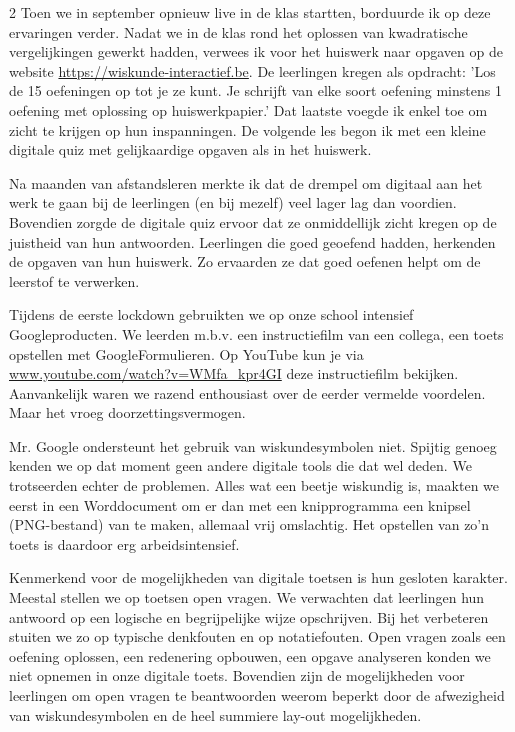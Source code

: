 \begin{multicols}{2}
Toen we in september opnieuw live in de klas startten, borduurde ik op deze ervaringen verder. Nadat we in de klas rond het oplossen van kwadratische vergelijkingen gewerkt hadden, verwees ik voor het huiswerk naar opgaven op de website \url{https://wiskunde-interactief.be}. De leerlingen kregen als opdracht: 'Los de 15 oefeningen op tot je ze kunt. Je schrijft van elke soort oefening minstens 1 oefening met oplossing op huiswerkpapier.' Dat laatste voegde ik enkel toe om zicht te krijgen op hun inspanningen.  De volgende les begon ik met een kleine digitale quiz met gelijkaardige opgaven als in het huiswerk. 

Na maanden van afstandsleren merkte ik dat de drempel om digitaal aan het werk te gaan bij de leerlingen (en bij mezelf) veel lager lag dan voordien. Bovendien zorgde de digitale quiz ervoor dat ze onmiddellijk zicht kregen op de juistheid van hun antwoorden. Leerlingen die goed geoefend hadden, herkenden de opgaven van hun huiswerk. Zo ervaarden ze dat goed oefenen helpt om de leerstof te verwerken.

\newpage
{}

Tijdens de eerste lockdown gebruikten we op onze school intensief Googleproducten. We leerden m.b.v. een instructiefilm van een collega, een toets opstellen met GoogleFormulieren. Op YouTube kun je via \url{www.youtube.com/watch?v=WMfa_kpr4GI} deze instructiefilm bekijken. Aanvankelijk waren we razend enthousiast over de eerder vermelde voordelen. Maar het vroeg doorzettingsvermogen. 

Mr. Google ondersteunt het gebruik van wiskundesymbolen niet. Spijtig genoeg kenden we op dat moment geen andere digitale tools die dat wel deden. We trotseerden echter de problemen. Alles wat een beetje wiskundig is, maakten we eerst in een Worddocument om er dan met een knipprogramma een knipsel (PNG-bestand) van te maken, allemaal vrij omslachtig. Het opstellen van zo'n toets is daardoor erg arbeidsintensief. 

Kenmerkend voor de mogelijkheden van digitale toetsen is hun gesloten karakter. Meestal stellen we op toetsen open vragen. We verwachten dat leerlingen hun antwoord op een logische en begrijpelijke wijze opschrijven. Bij het verbeteren stuiten we zo op typische denkfouten en op notatiefouten. Open vragen zoals een oefening oplossen, een redenering opbouwen, een opgave analyseren konden we niet opnemen in onze digitale toets. Bovendien zijn de mogelijkheden voor leerlingen om open vragen te beantwoorden weerom beperkt door de afwezigheid van wiskundesymbolen en de heel summiere lay-out mogelijkheden.


\end{multicols}
